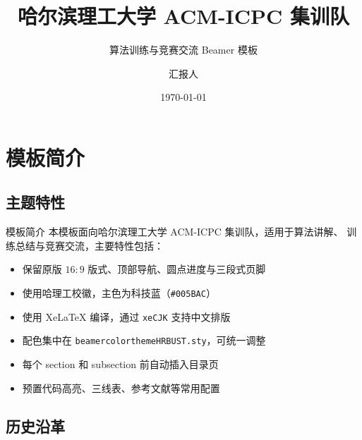 \documentclass[aspectratio=169]{beamer}
\author[ACM-ICPC]{汇报人}
\title[算法训练与竞赛交流]{哈尔滨理工大学 ACM-ICPC 集训队}
\subtitle{算法训练与竞赛交流 Beamer 模板}
\institute[哈理工集训队]{哈尔滨理工大学 ACM-ICPC 集训队}
\date{\today}
\begin{document}
\begin{frame}
    \titlepage
    \begin{figure}[htpb]
        \begin{center}
            \hrbustlogo
        \end{center}
    \end{figure}
\end{frame}

\begin{frame}
    \tableofcontents[sectionstyle=show,subsectionstyle=show/shaded/hide,subsubsectionstyle=show/shaded/hide]
\end{frame}

\section{模板简介}

\subsection{主题特性}

\begin{frame}{模板简介}
    本模板面向哈尔滨理工大学 ACM-ICPC 集训队，适用于算法讲解、
    训练总结与竞赛交流，主要特性包括：
    \begin{itemize}
        \item 保留原版 \(16:9\) 版式、顶部导航、圆点进度与三段式页脚
        \item 使用哈理工校徽，主色为科技蓝（\texttt{\#005BAC}）
        \item 使用 Xe\LaTeX{} 编译，通过 \texttt{xeCJK} 支持中文排版
        \item 配色集中在 \texttt{beamercolorthemeHRBUST.sty}，可统一调整
        \item 每个 section 和 subsection 前自动插入目录页
        \item 预置代码高亮、三线表、参考文献等常用配置
    \end{itemize}
\end{frame}

\subsection{历史沿革}
\end{document}
